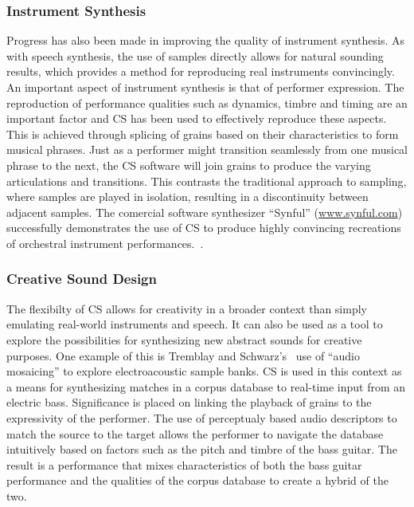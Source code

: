 \documentclass{scrartcl}
\begin{document}
    \subsubsection*{Instrument Synthesis}
    Progress has also been made in improving the quality of instrument
    synthesis. As with speech synthesis, the use of samples directly allows for
    natural sounding results, which provides a method for reproducing real
    instruments convincingly. An important aspect of instrument synthesis is
    that of performer expression. The reproduction of performance qualities
    such as dynamics, timbre and timing are an important factor and CS has been
    used to effectively reproduce these aspects. This is achieved through
    splicing of grains based on their characteristics to form musical phrases.
    Just as a performer might transition seamlessly from one musical phrase to
    the next, the CS software will join grains to produce the varying
    articulations and transitions. This contrasts the traditional approach to
    sampling, where samples are played in isolation, resulting in a
    discontinuity between adjacent samples.  The comercial software synthesizer
    ``Synful'' (\url{www.synful.com}) successfully demonstrates the use of
    CS to produce highly convincing recreations of orchestral instrument
    performances.~\parencite[p.82]{Lindemann2007}.

    \subsubsection*{Creative Sound Design}
    The flexibilty of CS allows for creativity in a broader context than simply
    emulating real-world instruments and speech. It can also be used as a tool
    to explore the possibilities for synthesizing new abstract sounds for
    creative purposes.
    One example of this is Tremblay and Schwarz's~\citeyearpar{Tremblay2010}
    use of ``audio mosaicing'' to explore electroacoustic sample banks. CS is
    used in this context as a means for synthesizing matches in a corpus
    database to real-time input from an electric bass.  Significance is placed
    on linking the playback of grains to the expressivity of the performer. The
    use of perceptualy based audio descriptors to match the source to the
    target allows the performer to navigate the database intuitively based on
    factors such as the pitch and timbre of the bass guitar. The result is a
    performance that mixes characteristics of both the bass guitar performance
    and the qualities of the corpus database to create a hybrid of the two.
\end{document}
